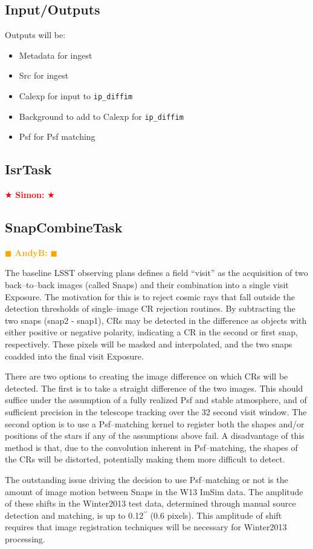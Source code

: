 \documentclass[12pt]{article}
\def\arcsec{^{\prime\prime}}
\newcommand{\becker} { \textcolor{orange} {
\ensuremath{\blacksquare} {\bf AndyB:}  
\ensuremath{\blacksquare} } }
\newcommand{\simon} { \textcolor{red} {
\ensuremath{\bigstar} {\bf Simon:}  
\ensuremath{\bigstar} } }
\begin{document}
\subsection{Input/Outputs}

Outputs will be:
\begin{itemize}
\item Metadata for ingest
\item Src for ingest
\item Calexp for input to {\tt ip\_diffim}
\item Background to add to Calexp for {\tt ip\_diffim}
\item Psf for Psf matching
\end{itemize}


\subsection{IsrTask} \simon

\subsection{SnapCombineTask} \becker

The baseline LSST observing plans defines a field ``visit'' as the
acquisition of two back--to--back images (called Snaps) and their
combination into a single visit Exposure.  The motivation for this is
to reject cosmic rays that fall outside the detection thresholds of
single--image CR rejection routines.  By subtracting the two snaps
(snap2 - snap1), CRs may be detected in the difference as objects with
either positive or negative polarity, indicating a CR in the second or
first snap, respectively.  These pixels will be masked and
interpolated, and the two snaps coadded into the final visit Exposure.

There are two options to creating the image difference on which CRs
will be detected.  The first is to take a straight difference of the
two images.  This should suffice under the assumption of a fully
realized Psf and stable atmosphere, and of sufficient precision in the
telescope tracking over the 32 second visit window.  The second option
is to use a Psf--matching kernel to register both the shapes and/or
positions of the stars if any of the assumptions above fail.  A
disadvantage of this method is that, due to the convolution inherent
in Psf--matching, the shapes of the CRs will be distorted, potentially
making them more difficult to detect.

The outstanding issue driving the decision to use Psf--matching or not
is the amount of image motion between Snaps in the W13 ImSim data.
The amplitude of these shifts in the Winter2013 test data, determined
through manual source detection and matching, is up to 0.12$\arcsec$
(0.6 pixels).  This amplitude of shift requires that image
registration techniques will be necessary for Winter2013 processing.
\end{document}
